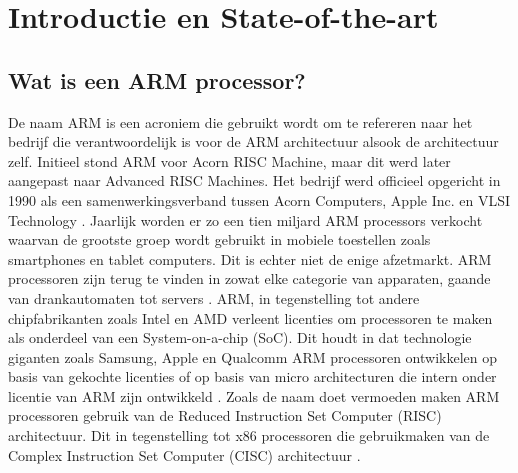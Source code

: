
\section{Introductie en State-of-the-art} %
\label{sec:introductie}

\subsection{Wat is een ARM processor?}
De naam ARM is een acroniem die gebruikt wordt om te refereren naar het bedrijf die verantwoordelijk is voor de ARM architectuur alsook de architectuur zelf. Initieel stond ARM voor Acorn RISC Machine, maar dit werd later aangepast naar Advanced RISC Machines. Het bedrijf werd officieel opgericht in 1990 als een samenwerkingsverband tussen Acorn Computers, Apple Inc. en VLSI Technology \autocite{Walshe2015}. Jaarlijk worden er zo een tien miljard ARM processors verkocht waarvan de grootste groep wordt gebruikt in mobiele toestellen zoals smartphones en tablet computers. Dit is echter niet de enige afzetmarkt. ARM processoren zijn terug te vinden in zowat elke categorie van apparaten, gaande van drankautomaten tot servers \autocite{Harris2015}. ARM, in tegenstelling tot andere chipfabrikanten zoals Intel en AMD verleent licenties om processoren te maken als onderdeel van een System-on-a-chip (SoC). Dit houdt in dat technologie giganten zoals Samsung, Apple en Qualcomm ARM processoren ontwikkelen op basis van gekochte licenties of op basis van micro architecturen die intern onder licentie van ARM zijn ontwikkeld \autocite{Asghar2020}. Zoals de naam doet vermoeden maken ARM processoren gebruik van de Reduced Instruction Set Computer (RISC) architectuur. Dit in tegenstelling tot x86 processoren die gebruikmaken van de Complex Instruction Set Computer (CISC) architectuur \autocite{Harris2015}. 

